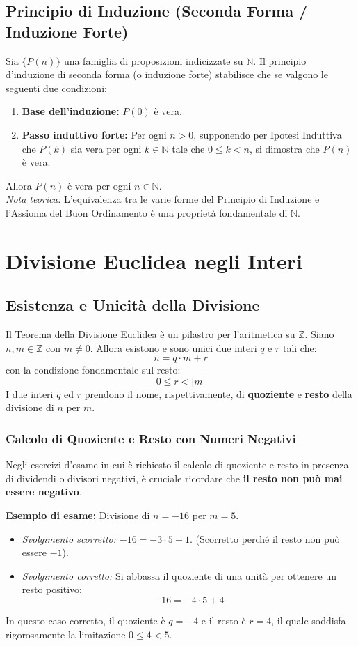 \documentclass[12pt, a4paper]{article}
\begin{document}
\subsection{Principio di Induzione (Seconda Forma / Induzione Forte)}
Sia $\{P(n)\}$ una famiglia di proposizioni indicizzate su $\mathbb{N}$. Il principio d'induzione di seconda forma (o induzione forte) stabilisce che se valgono le seguenti due condizioni:
\begin{enumerate}
    \item \textbf{Base dell'induzione:} $P(0)$ è vera.
    \item \textbf{Passo induttivo forte:} Per ogni $n > 0$, supponendo per Ipotesi Induttiva che $P(k)$ sia vera per ogni $k \in \mathbb{N}$ tale che $0 \le k < n$, si dimostra che $P(n)$ è vera.
\end{enumerate}
Allora $P(n)$ è vera per ogni $n \in \mathbb{N}$. \\
\emph{Nota teorica:} L'equivalenza tra le varie forme del Principio di Induzione e l'Assioma del Buon Ordinamento è una proprietà fondamentale di $\mathbb{N}$.


\section{Divisione Euclidea negli Interi}

\subsection{Esistenza e Unicità della Divisione}
Il Teorema della Divisione Euclidea è un pilastro per l'aritmetica su $\mathbb{Z}$.
Siano $n, m \in \mathbb{Z}$ con $m \neq 0$. Allora esistono e sono unici due interi $q$ e $r$ tali che:
\[ n = q \cdot m + r \]
con la condizione fondamentale sul resto:
\[ 0 \le r < |m| \]
I due interi $q$ ed $r$ prendono il nome, rispettivamente, di \textbf{quoziente} e \textbf{resto} della divisione di $n$ per $m$.

\subsubsection*{Calcolo di Quoziente e Resto con Numeri Negativi}
Negli esercizi d'esame in cui è richiesto il calcolo di quoziente e resto in presenza di dividendi o divisori negativi, è cruciale ricordare che \textbf{il resto non può mai essere negativo}.

\textbf{Esempio di esame:} Divisione di $n = -16$ per $m = 5$.
\begin{itemize}
    \item \emph{Svolgimento scorretto:} $-16 = -3 \cdot 5 - 1$. (Scorretto perché il resto non può essere $-1$).
    \item \emph{Svolgimento corretto:} Si abbassa il quoziente di una unità per ottenere un resto positivo:
    \[ -16 = -4 \cdot 5 + 4 \]
\end{itemize}
In questo caso corretto, il quoziente è $q = -4$ e il resto è $r = 4$, il quale soddisfa rigorosamente la limitazione $0 \le 4 < 5$.
\end{document}
